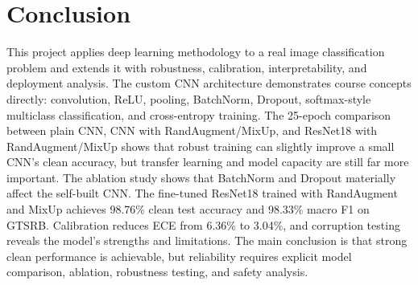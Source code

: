 \documentclass[12pt,letterpaper]{article}
\begin{document}
\section{Conclusion}
This project applies deep learning methodology to a real image classification problem and extends it with robustness, calibration, interpretability, and deployment analysis. The custom CNN architecture demonstrates course concepts directly: convolution, ReLU, pooling, BatchNorm, Dropout, softmax-style multiclass classification, and cross-entropy training. The 25-epoch comparison between plain CNN, CNN with RandAugment/MixUp, and ResNet18 with RandAugment/MixUp shows that robust training can slightly improve a small CNN's clean accuracy, but transfer learning and model capacity are still far more important. The ablation study shows that BatchNorm and Dropout materially affect the self-built CNN. The fine-tuned ResNet18 trained with RandAugment and MixUp achieves 98.76\% clean test accuracy and 98.33\% macro F1 on GTSRB. Calibration reduces ECE from 6.36\% to 3.04\%, and corruption testing reveals the model's strengths and limitations. The main conclusion is that strong clean performance is achievable, but reliability requires explicit model comparison, ablation, robustness testing, and safety analysis.
\end{document}
